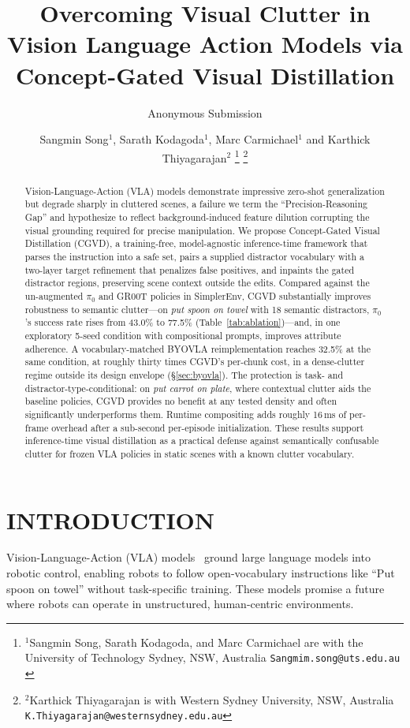 \documentclass[letterpaper, 10 pt, conference]{ieeeconf}  %
\title{\LARGE \bf
Overcoming Visual Clutter in Vision Language Action Models via Concept-Gated Visual Distillation
}
\author{Anonymous Submission}
\author{Sangmin Song$^{1}$, Sarath Kodagoda$^{1}$, Marc Carmichael$^{1}$ and Karthick Thiyagarajan$^{2}$%
\thanks{$^{1}$Sangmin Song, Sarath Kodagoda, and Marc Carmichael are with the University of Technology Sydney, NSW, Australia
        {\tt\small Sangmim.song@uts.edu.au }}%
\thanks{$^{2}$Karthick Thiyagarajan is with Western Sydney University, NSW, Australia
        {\tt\small K.Thiyagarajan@westernsydney.edu.au}}%
}
\begin{document}
\maketitle
\thispagestyle{empty}
\pagestyle{empty}

\begin{abstract}
Vision-Language-Action (VLA) models demonstrate impressive zero-shot generalization but degrade sharply in cluttered scenes, a failure we term the ``Precision-Reasoning Gap'' and hypothesize to reflect background-induced feature dilution corrupting the visual grounding required for precise manipulation. We propose Concept-Gated Visual Distillation (CGVD), a training-free, model-agnostic inference-time framework that parses the instruction into a safe set, pairs a supplied distractor vocabulary with a two-layer target refinement that penalizes false positives, and inpaints the gated distractor regions, preserving scene context outside the edits. Compared against the un-augmented $\pi_0$ and GR00T policies in SimplerEnv, CGVD substantially improves robustness to semantic clutter---on \textit{put spoon on towel} with 18 semantic distractors, $\pi_0$'s success rate rises from 43.0\% to 77.5\% (Table~\ref{tab:ablation})---and, in one exploratory 5-seed condition with compositional prompts, improves attribute adherence. A vocabulary-matched BYOVLA reimplementation reaches 32.5\% at the same condition, at roughly thirty times CGVD's per-chunk cost, in a dense-clutter regime outside its design envelope (\S\ref{sec:byovla}). The protection is task- and distractor-type-conditional: on \textit{put carrot on plate}, where contextual clutter aids the baseline policies, CGVD provides no benefit at any tested density and often significantly underperforms them. Runtime compositing adds roughly 16\,ms of per-frame overhead after a sub-second per-episode initialization. These results support inference-time visual distillation as a practical defense against semantically confusable clutter for frozen VLA policies in static scenes with a known clutter vocabulary.
\end{abstract}



\section{INTRODUCTION}


Vision-Language-Action (VLA) models~\cite{openvla, rt2, octo, gr00t, pi0} ground large language models into robotic control, enabling robots to follow open-vocabulary instructions like ``Put spoon on towel'' without task-specific training. These models promise a future where robots can operate in unstructured, human-centric environments.
\end{document}
